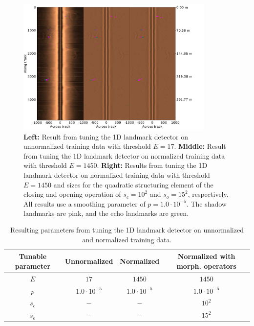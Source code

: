 \begin{figure} [ht!]
    \centering
    \includegraphics[trim=0cm 0cm 2.5cm 0cm, clip=true, width=0.87\textwidth]{figures/1D_result_training.pdf}
    \caption{\textbf{Left:} Result from tuning the 1D landmark detector on unnormalized training data with threshold $E = 17$. \textbf{Middle:} Result from tuning the 1D landmark detector on normalized training data with threshold $E = 1450$. \textbf{Right:} Results from tuning the 1D landmark detector on normalized training data with threshold $E = 1450$ and sizes for the quadratic structuring element of the closing and opening operation of $s_c = 10^2$ and $s_o = 15^2$, respectively. All results use a smoothing parameter of $p = 1.0 \cdot 10^{-5}$. The shadow landmarks are pink, and the echo landmarks are green.}
    \label{fig:1D_tuning_results}
\end{figure}

\begin{table} [ht!]
    \caption{Resulting parameters from tuning the 1D landmark detector on unnormalized and normalized training data.}
    \centering
    \begin{tabular}{cccc}
        \hline
        \textbf{Tunable parameter} & \textbf{Unnormalized} & \textbf{Normalized} & \textbf{Normalized with morph. operators} \\ \hline
        $E$                        & $17$                  & $1450$              & $1450$                                    \\
        $p$                        & $1.0 \cdot 10^{-5}$   & $1.0 \cdot 10^{-5}$ & $1.0 \cdot 10^{-5}$                              \\
        $s_c$                      & $-$                   & $-$                 & $10^2$                                    \\
        $s_o$                      & $-$                   & $-$                 & $15^2$                                    \\ \hline
    \end{tabular}
    \label{tab:1D_parameters}
\end{table}


